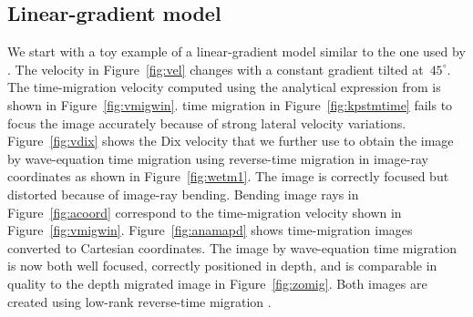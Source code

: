 \documentclass[manuscript]{geophysics}
\begin{document}
\subsection{Linear-gradient model}
We start with a toy example of a linear-gradient model similar to the one used by \cite{TLE21-12-12371241}. The velocity in Figure~\ref{fig:vel} changes with a constant gradient tilted at~$45^{\circ}$. 
The time-migration velocity computed using the analytical expression from \cite{siwei2} is shown in Figure~\ref{fig:vmigwin}.  time migration in Figure~\ref{fig:kpstmtime} fails to focus the image accurately because of strong lateral velocity variations.  Figure~\ref{fig:vdix} shows the Dix velocity that we further use to obtain the image by wave-equation time migration using reverse-time migration in image-ray coordinates  as shown in Figure~\ref{fig:wetm1}. The image is correctly focused but distorted because of image-ray bending. Bending image rays in Figure~\ref{fig:acoord} correspond to the time-migration velocity shown in Figure~\ref{fig:vmigwin}. 
Figure~\ref{fig:anamapd} shows time-migration images converted to Cartesian coordinates. The image by wave-equation time migration is now both well focused, correctly positioned in depth, and is comparable in quality to the depth migrated image in Figure~\ref{fig:zomig}. Both images are created using low-rank reverse-time migration \cite[]{lowrank}.
\end{document}
